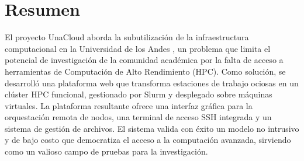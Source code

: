 \section{Resumen}

El proyecto UnaCloud aborda la subutilización de la infraestructura computacional en la Universidad de los Andes , un problema que limita el potencial de investigación de la comunidad académica por la falta de acceso a herramientas de Computación de Alto Rendimiento (HPC). Como solución, se desarrolló una plataforma web que transforma estaciones de trabajo ociosas en un clúster HPC funcional, gestionado por Slurm y desplegado sobre máquinas virtuales. La plataforma resultante ofrece una interfaz gráfica para la orquestación remota de nodos, una terminal de acceso SSH integrada y un sistema de gestión de archivos. El sistema valida con éxito un modelo no intrusivo y de bajo costo que democratiza el acceso a la computación avanzada, sirviendo como un valioso campo de pruebas para la investigación.